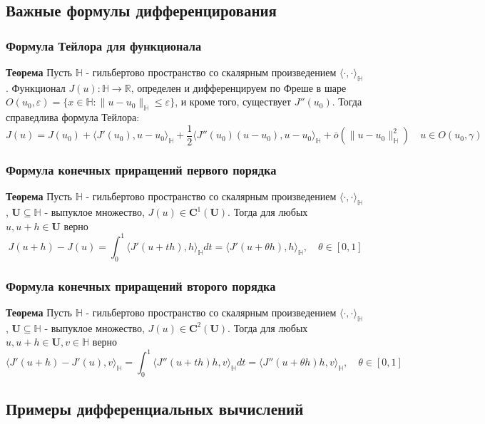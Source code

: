 \documentclass[A4]{article}
\begin{document}
\subsection{Важные формулы дифференцирования}
\subsubsection{Формула Тейлора для функционала}
\textbf{Теорема} Пусть $\mathbb{H}$ - гильбертово пространство со скалярным произведением $\langle\cdot,\cdot\rangle_{\mathbb{H}}$. Функционал $J(u):\mathbb{H}\rightarrow\mathbb{R}$, определен и дифференцируем по Фреше в шаре $O(u_0,\varepsilon) =\{x\in\mathbb{H}:\|u-u_0\|_{\mathbb{H}}\leqslant\varepsilon\}$, и кроме того, существует $J''(u_0)$. Тогда справедлива формула Тейлора:
\begin{equation*}
J(u)=J(u_0)+\langle J'(u_0),u-u_0\rangle_{\mathbb{H}}+\frac{1}{2}\langle J''(u_0)(u-u_0),u-u_0\rangle_{\mathbb{H}}+\bar{o}(\|u-u_0\|^2_{\mathbb{H}})\quad u\in O(u_0,\gamma)
\end{equation*}
\subsubsection{Формула конечных приращений первого порядка}
\textbf{Теорема} Пусть $\mathbb{H}$ - гильбертово пространство со скалярным произведением $\langle\cdot,\cdot\rangle_{\mathbb{H}}$, $\mathbf{U}\subseteq\mathbb{H}$ - выпуклое множество, $J(u)\in\mathbf{C}^1(\mathbf{U}).$ Тогда для любых $u,u+h\in\mathbf{U}$ верно
\begin{equation*}
J(u+h)-J(u)=\int_{0}^{1}\langle J'(u+th),h\rangle_{\mathbb{H}}dt=\langle J'(u+\theta h),h\rangle_{\mathbb{H}},\quad \theta\in[0,1]
\end{equation*}
\subsubsection{Формула конечных приращений второго порядка}
\textbf{Теорема} Пусть $\mathbb{H}$ - гильбертово пространство со скалярным произведением $\langle\cdot,\cdot\rangle_{\mathbb{H}}$, $\mathbf{U}\subseteq\mathbb{H}$ - выпуклое множество, $J(u)\in\mathbf{C}^2(\mathbf{U}).$ Тогда для любых $u,u+h\in\mathbf{U},v\in\mathbb{H}$ верно
\begin{equation*}
\langle J'(u+h)-J'(u),v\rangle_{\mathbb{H}}=\int_{0}^{1}\langle J''(u+th)h,v\rangle_{\mathbb{H}}dt=\langle J''(u+\theta h)h,v\rangle_{\mathbb{H}},\quad \theta\in[0,1]
\end{equation*}
\subsection{Примеры дифференциальных вычислений}
\end{document}

